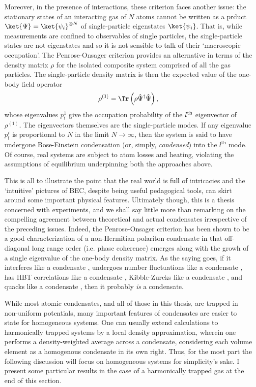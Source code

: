 	Moreover, in the presence of interactions, these criterion faces another issue: the stationary states of an interacting gas of $N$ atoms cannot be written as a prduct $\ket{\Psi} = \ket{\psi_i}^{\otimes N}$ of single-particle eigenstates $\ket{\psi_i}$.
	That is, while measurements are confined to observables of single particles, the single-particle states are not eigenstates and so it is not sensible to talk of their `macroscopic occupation'.
	The Penrose-Onsager criterion \cite{Penrose56} provides an alternative in terms of the density matrix $\rho$ for the isolated composite system comprised of all the gas particles.
	The single-particle density matrix is then the expected value of the one-body field operator
	\begin{equation}
		\rho^{(1)} = \Tr\left(\rho\hat{\Psi}^\dagger\hat{\Psi}\right),
	\end{equation}
	whose eigenvalues $p_{l}^{1}$ give the occupation probability of the $l^{\rm th}$ eigenvector of $\rho^{(1)}$.
	The eigenvectors themselves are the single-particle modes.
	If any eigenvalue $p_{l}^{i}$ is proportional to $N$ in the limit $N\rightarrow\infty$, then the system is said to have undergone Bose-Einstein condensation (or, simply, \emph{condensed}) into the $l^\textrm{th}$ mode.
	Of course, real systems are subject to atom losses and heating, violating the assumptions of equilibrium underpinning both the approaches above.
	
	This is all to illustrate the point that the real world is full of intricacies and the `intuitive' pictures of BEC, despite being useful pedagogical tools, can skirt around some important physical features.
	Ultimately though, this is a thesis concerned with experiments, and we shall say little more than remarking on the compelling agreement between theoretical and actual condensates irrespective of the preceding issues.
	Indeed, the Penrose-Onsager criterion has been shown to be a good characterization of a non-Hermitian polariton condensate \cite{Manni12} in that off-diagonal long range order (i.e. phase coherence) emerges along with the growh of a single eigenvalue of the one-body density matrix.
	As the saying goes, if it interferes like a condensate \cite{Andrews97} , undergoes number fluctuations like a condensate \cite{Kristensen19},  has HBT correlations like a condensate \cite{Schellekens05,Jeltes07}, Kibble-Zureks like a condensate \cite{Anquez16}, and quacks like a condensate \cite{Duck01}, then it probably \emph{is} a condensate.

	While most atomic condensates, and all of those in this thesis, are trapped in non-uniform potentials, many important features of condensates are easier to state for homogeneous systems.
	One can usually extend calculations to harmonically trapped systems by a local density approximation, wherein one performs a density-weighted average across a condensate, considering each volume element as a homogenous condensate in its own right.
	Thus, for the most part the following discussion will focus on homogeneous systems for simplicity's sake.
	I present some particular results in the case of a harmonically trapped gas at the end of this section.


